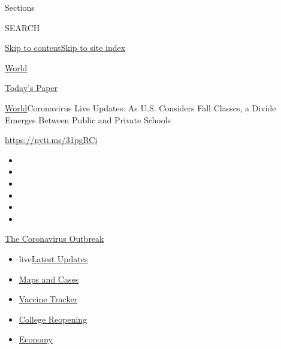 Sections

SEARCH

\protect\hyperlink{site-content}{Skip to
content}\protect\hyperlink{site-index}{Skip to site index}

\href{https://www.nytimes.com/section/world}{World}

\href{https://myaccount.nytimes.com/auth/login?response_type=cookie\&client_id=vi}{}

\href{https://www.nytimes.com/section/todayspaper}{Today's Paper}

\href{/section/world}{World}\textbar{}Coronavirus Live Updates: As U.S.
Considers Fall Classes, a Divide Emerges Between Public and Private
Schools

\url{https://nyti.ms/31pgRCi}

\begin{itemize}
\item
\item
\item
\item
\item
\item
\end{itemize}

\href{https://www.nytimes.com/news-event/coronavirus?action=click\&pgtype=Article\&state=default\&region=TOP_BANNER\&context=storylines_menu}{The
Coronavirus Outbreak}

\begin{itemize}
\tightlist
\item
  live\href{https://www.nytimes.com/2020/08/04/world/coronavirus-cases.html?action=click\&pgtype=Article\&state=default\&region=TOP_BANNER\&context=storylines_menu}{Latest
  Updates}
\item
  \href{https://www.nytimes.com/interactive/2020/us/coronavirus-us-cases.html?action=click\&pgtype=Article\&state=default\&region=TOP_BANNER\&context=storylines_menu}{Maps
  and Cases}
\item
  \href{https://www.nytimes.com/interactive/2020/science/coronavirus-vaccine-tracker.html?action=click\&pgtype=Article\&state=default\&region=TOP_BANNER\&context=storylines_menu}{Vaccine
  Tracker}
\item
  \href{https://www.nytimes.com/2020/08/02/us/covid-college-reopening.html?action=click\&pgtype=Article\&state=default\&region=TOP_BANNER\&context=storylines_menu}{College
  Reopening}
\item
  \href{https://www.nytimes.com/live/2020/08/04/business/stock-market-today-coronavirus?action=click\&pgtype=Article\&state=default\&region=TOP_BANNER\&context=storylines_menu}{Economy}
\end{itemize}

